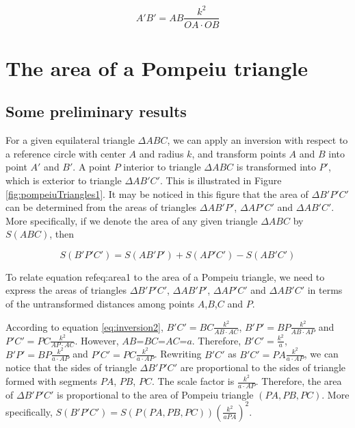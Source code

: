 \documentclass[12pt]{article}
\begin{document}
\begin{equation}
{A'B'}={AB}\frac{k^2}{OA\cdot OB}
\label{eq:inversion2}
\end{equation}

\section{The area of a Pompeiu triangle}

\subsection{Some preliminary results}
For a given equilateral triangle $\Delta ABC$, we can apply an inversion with respect to a reference circle with center $A$ and radius $k$, and transform points $A$ and $B$ into point $A'$ and $B'$. A point $P$ interior to triangle $\Delta ABC$ is transformed into $P'$, which is exterior to triangle $\Delta AB'C'$. This is illustrated in Figure \ref{fig:pompeiuTriangles1}. It may be noticed in this figure that the area of $\Delta B'P'C'$ can be determined from the areas of triangles $\Delta AB'P'$, $\Delta AP'C'$ and $\Delta AB'C'$.  More specifically, if we denote the area of any given triangle $\Delta ABC$ by $S(ABC)$, then

\begin{equation}
S(B'P'C')=S(AB'P')+S(AP'C')-S(AB'C')
\label{eq:area1}
\end{equation}

To relate equation ref{eq:area1} to the area of a Pompeiu triangle, we need to express the areas of triangles $\Delta B'P'C'$, $\Delta AB'P'$, $\Delta AP'C'$ and $\Delta AB'C'$ in terms of the untransformed distances among points $A$,$B$,$C$ and $P$.

According to equation \ref{eq:inversion2}, $B'C'=BC\frac{k^2}{AB\cdot AC}$, $B'P'=BP\frac{k^2}{AB\cdot AP}$ and $P'C'=PC\frac{k^2}{AP\cdot AC}$. 
However, $AB$=$BC$=$AC$=$a$. Therefore, $B'C'=\frac{k^2}{a}$, $B'P'=BP\frac{k^2}{a\cdot AP}$ and $P'C'=PC\frac{k^2}{a\cdot AP}$. Rewriting $B'C'$ as $B'C'=PA \frac{k^2}{a \cdot AP}$, we can notice that the sides of triangle $\Delta B'P'C'$ are proportional to the sides of triangle formed with segments $PA$, $PB$, $PC$. The scale factor is $\frac{k^2}{a \cdot AP}$. Therefore, the area of $\Delta B'P'C'$ is proportional to the area of Pompeiu triangle $(PA,PB,PC)$. More specifically, $S(B'P'C')=S(P(PA,PB,PC))(\frac{k^2}{a PA})^2$.
\end{document}
